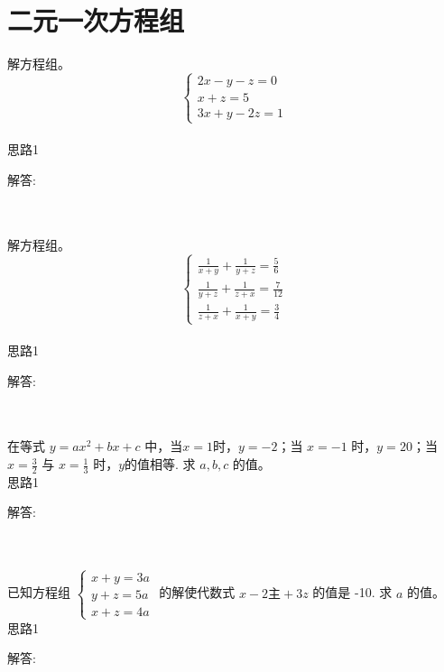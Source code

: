 \section{二元一次方程组}

\item {
    解方程组。
    \[\left\{
        \begin{array}{l}
            2x - y - z = 0 \\
            x + z = 5 \\
            3x + y - 2z = 1
        \end{array}
    \right.\]
    \ifshowSolution
        \fangsong{}
        \\
        思路1

        解答: 
    \else
        \\ \\ \\ 
    \fi
}

\item {
    解方程组。
    \[\left\{
        \begin{array}{l}
            \frac{1}{x+y} + \frac{1}{y+z} = \frac{5}{6} \\
            \frac{1}{y+z} + \frac{1}{z+x} = \frac{7}{12} \\
            \frac{1}{z+x} + \frac{1}{x+y} = \frac{3}{4}
        \end{array}
    \right.\]
    \ifshowSolution
        \fangsong{}
        \\
        思路1

        解答: 
    \else
        \\ \\ \\ 
    \fi
}

\item {
    在等式 $y=ax^2+bx+c$ 中，当$x=1$时，$y=-2$；当 $x=-1$ 时，$y=20$；当 $x=\frac32$ 与 $x=\frac13$ 时，$y$的值相等. 求 $a,b,c$ 的值。
    \ifshowSolution
        \fangsong{}
        \\
        思路1

        解答: 
    \else
        \\ \\ \\ 
    \fi
}

\item {
    已知方程组
    $\begin{cases}
        x+y=3a \\ 
        y+z=5a \\ 
        x+z=4a 
    \end{cases}$
    的解使代数式 $x-2主+3z$ 的值是 -10.  求 $a$ 的值。
    \ifshowSolution
        \fangsong{}
        \\
        思路1

        解答: 
    \else
        \\ \\ \\ 
    \fi
}

